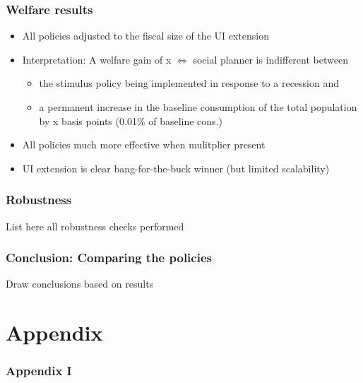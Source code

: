 \documentclass[pdflatex]{beamer}
\begin{document}
\begin{frame}
\frametitle{Welfare results}

	\begin{table}[ht] 
		
	\end{table}

	\begin{itemize}
		\item All policies adjusted to the fiscal size of the UI extension
		\item Interpretation: A welfare gain of x $\Leftrightarrow$ social planner is indifferent between 
		\begin{itemize}
			\item the stimulus policy being implemented in response to a recession and 
			\item a permanent increase in the baseline consumption of the total population by x basis points (0.01\% of baseline cons.)
		\end{itemize}
	
		\item All policies much more effective when mulitplier present
		\item UI extension is clear bang-for-the-buck winner (but limited scalability)
	\end{itemize}


\end{frame}


\begin{frame}
\frametitle{Robustness}
List here all robustness checks performed
\end{frame}


\begin{frame}
\frametitle{Conclusion: Comparing the policies}
Draw conclusions based on results
\end{frame}


\section{Appendix}

\begin{frame}
\frametitle{Appendix I}
\end{frame}
\end{document}
